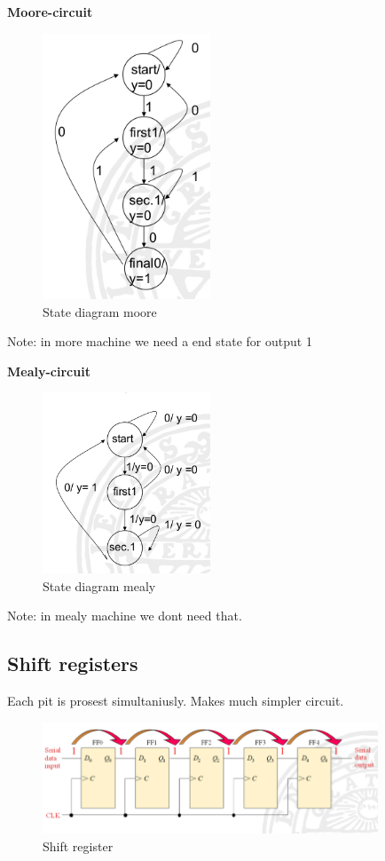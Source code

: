 \newpage
\textbf{Moore-circuit}  
\begin{figure}[h]
    \centering
    \includegraphics[width=5cm]{image/state-diagram-moore.png}
    \caption{State diagram moore}
\end{figure}
Note: in more machine we need a end state for output 1

\textbf{Mealy-circuit}  
\begin{figure}[h]
    \centering
    \includegraphics[width=5cm]{image/state-diagram-mealy.png}
    \caption{State diagram mealy}
\end{figure}
Note: in mealy machine we dont need that.





\newpage
\subsection{Shift registers}
Each pit is prosest simultaniusly. Makes much simpler circuit.
\begin{figure}[h]
    \centering
    \includegraphics[width=10cm]{image/shift-register.png}
    \caption{Shift register}
\end{figure}

